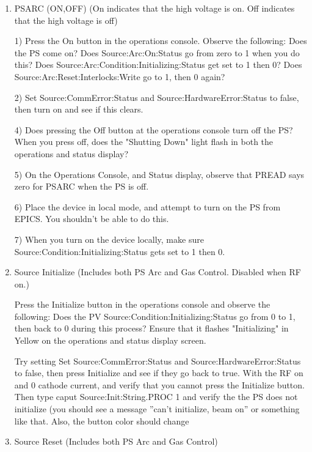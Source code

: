 \documentclass[11pt]{book}		%
\begin{document}
\begin{enumerate}
 \item PSARC (ON,OFF) (On indicates that the high voltage is on.  Off indicates that the high voltage is off)

\color{red}
1) Press the On button in the operations console. Observe the following: 
	Does the PS come on? 
	Does Source:Arc:On:Status go from zero to 1 when you do this? 
	Does Source:Arc:Condition:Initializing:Status get set to 1 then 0?
	Does Source:Arc:Reset:Interlocks:Write go to 1, then 0 again?

2) Set Source:CommError:Status and Source:HardwareError:Status to false, then turn on and see if this clears.

4) Does pressing the Off button at the operations console turn off the PS? When you press off, does the "Shutting Down" light flash in both the operations and status display?

5) On the Operations Console, and Status display, observe that PREAD says zero for PSARC when the PS is off.

6) Place the device in local mode, and attempt to turn on the PS from EPICS. You shouldn't be able to do this.

7) When you turn on the device locally, make sure Source:Condition:Initializing:Status gets set to 1 then 0.


\color{black}


 \item Source Initialize (Includes both PS Arc and Gas Control. Disabled when RF on.)


\color{red}

Press the Initialize button in the operations console and observe the following:
	Does the PV Source:Condition:Initializing:Status go from 0 to 1, then back to 0 during this process? 
	Ensure that it flashes "Initializing" in Yellow on the operations and status display screen. 

Try setting Set Source:CommError:Status and Source:HardwareError:Status to false, then press Initialize and see if they go back to true.
With the RF on and 0 cathode current, and verify that you cannot press the Initialize button. Then type caput Source:Init:String.PROC 1 and verify the the PS does not initialize (you should see a message ''can't initialize, beam on'' or something like that. Also, the button color should change

\color{black}



 \item Source Reset (Includes both PS Arc and Gas Control)



\end{enumerate}
\end{document}
